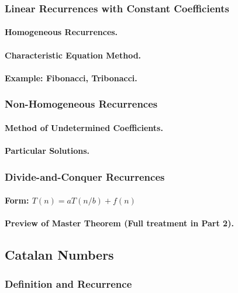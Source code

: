 \subsubsection{Linear Recurrences with Constant Coefficients}
\paragraph{Homogeneous Recurrences.}
\paragraph{Characteristic Equation Method.}
\paragraph{Example: Fibonacci, Tribonacci.}

\subsubsection{Non-Homogeneous Recurrences}
\paragraph{Method of Undetermined Coefficients.}
\paragraph{Particular Solutions.}

\subsubsection{Divide-and-Conquer Recurrences}
\paragraph{Form: $T(n) = aT(n/b) + f(n)$}
\paragraph{Preview of Master Theorem (Full treatment in Part 2).}

\subsection{Catalan Numbers}
\label{subsec:catalan}

\subsubsection{Definition and Recurrence}
